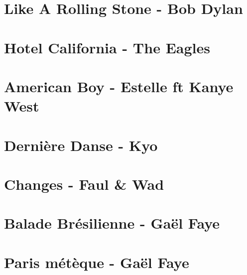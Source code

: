 \documentclass{guitartabs}
\begin{document}
\section*{Like A Rolling Stone - Bob Dylan}
\begin{guitar}

\end{guitar}



\section{Hotel California - The Eagles}
\begin{guitar}

\end{guitar}


\section{American Boy - Estelle ft Kanye West}
\begin{guitar}

\end{guitar}

\section{Dernière Danse - Kyo}
\begin{guitar}

\end{guitar}


\section{Changes - Faul \& Wad}
\begin{guitar}

\end{guitar}

\section{Balade Brésilienne - Gaël Faye}
\begin{guitar}

\end{guitar}


\section{Paris métèque - Gaël Faye}
\begin{guitar}

\end{guitar}
\end{document}
